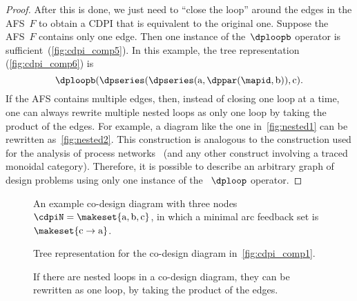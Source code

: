 \begin{proof}
    After this is done, we just need to ``close the loop'' around the edges in the AFS~$F$ to obtain a CDPI that is equivalent to the original one.
    Suppose the AFS~$F$ contains only one edge.
    Then one instance of the~$\dploopb$ operator is sufficient~(\cref{fig:cdpi_comp5}).
    In this example, the tree representation (\cref{fig:cdpi_comp6}) is
    \begin{equation}
        \dploopb(\dpseries(\dpseries(\text{a},\dppar(\mapid,\text{b})),\text{c}).
    \end{equation}
    If the AFS contains multiple edges, then, instead of closing one loop at a time, one can always rewrite multiple nested loops as only one loop by taking the product of the edges.
    For example, a diagram like the one in~\cref{fig:nested1} can be rewritten as~\cref{fig:nested2}.
    This construction is analogous to the construction used for the analysis of process networks~\cite{lee10} (and any other construct involving a traced monoidal category).
    Therefore, it is possible to describe an arbitrary graph of design problems using only one instance of the ~$\dploop$ operator.
\end{proof}

\begin{figure}[tbh]
    \hfill{}
    \hfill{}

    \caption{An example co-design diagram with three nodes~$\cdpiN=\makeset{\text{a},\text{b},\text{c}}$,
        in which a minimal arc feedback set is $\makeset{\text{c}\rightarrow\text{a}}$.
    }
\end{figure}

\begin{figure}
    \hfill{}
    \hfill{}
    \hfill{}

    \caption{Tree representation for the co-design diagram in~\cref{fig:cdpi_comp1}.}
\end{figure}

\begin{figure}[h]
    \caption{If there are nested loops in a co-design diagram, they can be rewritten as one loop, by taking the product of the edges.}
    \label{fig:If-there-are}
\end{figure}
